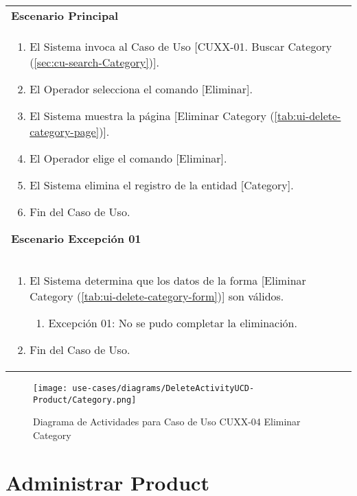 	\begin{tabular}{ p{15.5cm} }
		\textbf{Escenario Principal} \\
		\begin{enumerate}
			\item El Sistema invoca al Caso de Uso [CUXX-01. Buscar Category (\ref{sec:cu-search-Category})].
			\item El Operador selecciona el comando [Eliminar].
			\item El Sistema muestra la p\'agina [Eliminar Category (\ref{tab:ui-delete-category-page})].
			\item El Operador elige el comando [Eliminar].
			\item El Sistema elimina el registro de la entidad [Category].
			\item Fin del Caso de Uso.
		\end{enumerate}
		\textbf{Escenario Excepci\'on 01} \\
		\begin{enumerate}
		   \item El Sistema determina que los datos de la forma [Eliminar Category (\ref{tab:ui-delete-category-form})] son v\'alidos.
		   	\begin{enumerate}
		   		\item Excepci\'on 01: No se pudo completar la eliminaci\'on.
		    \end{enumerate}
		   \item Fin del Caso de Uso.
		\end{enumerate}
	\end{tabular}
	
	\begin{figure}[H]
	  \begin{center}
		 \label{tab:activity-delete-ucd-entity-category}
		 \texttt{[image: use-cases/diagrams/DeleteActivityUCD-Product/Category.png]}
		 \caption{Diagrama de Actividades para Caso de Uso CUXX-04 Eliminar Category}
	  \end{center}
	\end{figure}
	
	\clearpage
	\section{Administrar Product} \label{sec:cf-uc-admin-product}
	
